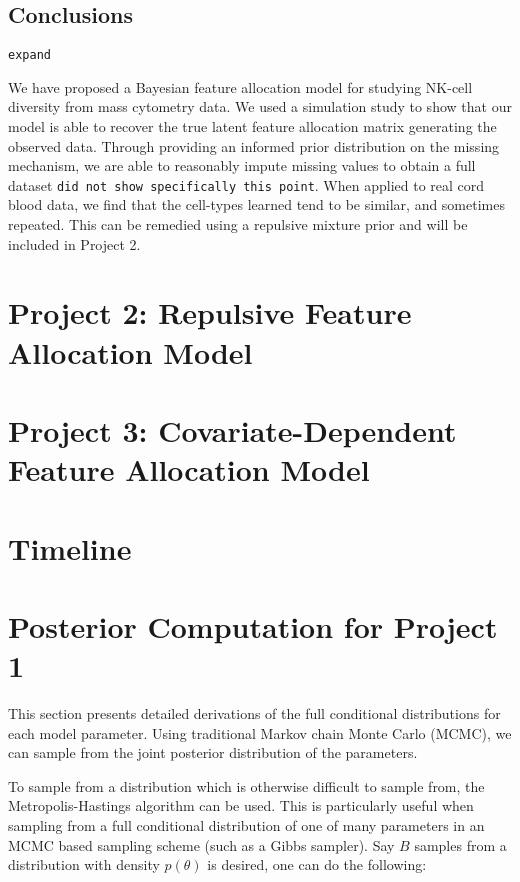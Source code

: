 \documentclass[12pt,]{article}
\begin{document}
\subsection{Conclusions}

{\tt expand}

We have proposed a Bayesian feature allocation model for studying NK-cell
diversity from mass cytometry data. We used a simulation study to show that our
model is able to recover the true latent feature allocation matrix generating
the observed data. Through providing an informed prior distribution on the
missing mechanism, we are able to reasonably impute missing values to obtain a
full dataset
%
{\tt did not show specifically this point}.
%
When applied to real cord blood data, we find that the
cell-types learned tend to be similar, and sometimes repeated. This can be
remedied using a repulsive mixture prior and will be included in Project 2.


\section{Project 2: Repulsive Feature Allocation Model}\label{sec:proj2}

\section{Project 3: Covariate-Dependent Feature Allocation Model}\label{sec:proj3}

\section{Timeline}\label{sec:time}






\appendix
\section{Posterior Computation for Project 1}
This section presents detailed derivations of the full conditional
distributions for each model parameter. Using traditional Markov
chain Monte Carlo (MCMC), we can sample from the joint posterior 
distribution of the parameters.

To sample from a distribution which is otherwise difficult to sample
from, the Metropolis-Hastings algorithm can be used. This is
particularly useful when sampling from a full conditional distribution
of one of many parameters in an MCMC based sampling scheme (such as a
Gibbs sampler). Say \(B\) samples from a distribution with density
\(p(\theta)\) is desired, one can do the following:
\end{document}
